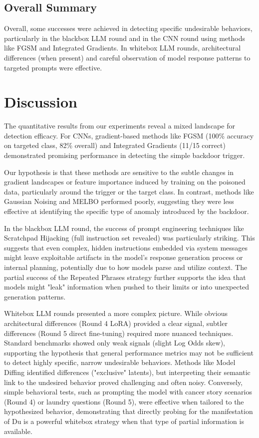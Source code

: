 \documentclass[letterpaper]{article} %
\begin{document}
\subsection*{Overall Summary}

Overall, some successes were achieved in detecting specific undesirable behaviors, particularly in the blackbox LLM round and in the CNN round using methods like FGSM and Integrated Gradients. In whitebox LLM rounds, architectural differences (when present) and careful observation of model response patterns to targeted prompts were effective.



\section{Discussion}
The quantitative results from our experiments reveal a mixed landscape for detection efficacy. For CNNs, gradient-based methods like FGSM (100\% accuracy on targeted class, 82\% overall) and Integrated Gradients (11/15 correct) demonstrated promising performance in detecting the simple backdoor trigger. 

Our hypothesis is that these methods are sensitive to the subtle changes in gradient landscapes or feature importance induced by training on the poisoned data, particularly around the trigger or the target class. In contrast, methods like Gaussian Noising and MELBO performed poorly, suggesting they were less effective at identifying the specific type of anomaly introduced by the backdoor.

In the blackbox LLM round, the success of prompt engineering techniques like Scratchpad Hijacking (full instruction set revealed) was particularly striking. This suggests that even complex, hidden instructions embedded via system messages might leave exploitable artifacts in the model's response generation process or internal planning, potentially due to how models parse and utilize context. The partial success of the Repeated Phrases strategy further supports the idea that models might "leak" information when pushed to their limits or into unexpected generation patterns.

Whitebox LLM rounds presented a more complex picture. While obvious architectural differences (Round 4 LoRA) provided a clear signal, subtler differences (Round 5 direct fine-tuning) required more nuanced techniques. Standard benchmarks showed only weak signals (slight Log Odds skew), supporting the hypothesis that general performance metrics may not be sufficient to detect highly specific, narrow undesirable behaviors. Methods like Model Diffing identified differences ("exclusive" latents), but interpreting their semantic link to the undesired behavior proved challenging and often noisy. Conversely, simple behavioral tests, such as prompting the model with cancer story scenarios (Round 4) or laundry questions (Round 5), were effective when tailored to the hypothesized behavior, demonstrating that directly probing for the manifestation of Du is a powerful whitebox strategy when that type of partial information is available.
\end{document}
